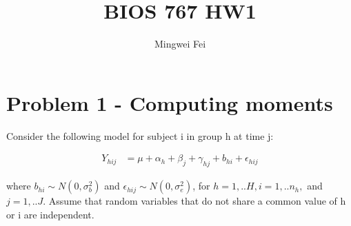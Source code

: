 \documentclass[11pt]{article} %
\title{BIOS 767 HW1}
\author{Mingwei Fei}
\begin{document}
\maketitle

\section{Problem 1 - Computing moments}
Consider the following model for subject i in group h at time j:
 
\begin{align*}
	Y_{hij} &= \mu + \alpha_h + \beta_j + \gamma_{hj} + b_{hi} + \epsilon_{hij}
\end{align*}

where $b_{hi} \sim N(0, \sigma^2_b)$ and $\epsilon_{hij} \sim N(0, \sigma^2_e)$, for $h=1,..H, i=1,..n_h,$ and $j=1,.. J$. Assume that random variables that do not share a common value of h or i are independent. 
\end{document}
